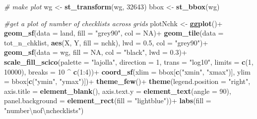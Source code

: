 \documentclass[]{article}
\newenvironment{Shaded}{}{}
\newcommand{\CharTok}[1]{\textcolor[rgb]{0.25,0.44,0.63}{#1}}
\newcommand{\CommentTok}[1]{\textcolor[rgb]{0.38,0.63,0.69}{\textit{#1}}}
\newcommand{\DataTypeTok}[1]{\textcolor[rgb]{0.56,0.13,0.00}{#1}}
\newcommand{\DecValTok}[1]{\textcolor[rgb]{0.25,0.63,0.44}{#1}}
\newcommand{\FloatTok}[1]{\textcolor[rgb]{0.25,0.63,0.44}{#1}}
\newcommand{\KeywordTok}[1]{\textcolor[rgb]{0.00,0.44,0.13}{\textbf{#1}}}
\newcommand{\NormalTok}[1]{#1}
\newcommand{\OperatorTok}[1]{\textcolor[rgb]{0.40,0.40,0.40}{#1}}
\newcommand{\OtherTok}[1]{\textcolor[rgb]{0.00,0.44,0.13}{#1}}
\newcommand{\StringTok}[1]{\textcolor[rgb]{0.25,0.44,0.63}{#1}}
\begin{document}
\begin{Shaded}
\begin{Highlighting}[]
\CommentTok{# make plot}
\NormalTok{wg <-}\StringTok{ }\KeywordTok{st_transform}\NormalTok{(wg, }\DecValTok{32643}\NormalTok{)}
\NormalTok{bbox <-}\StringTok{ }\KeywordTok{st_bbox}\NormalTok{(wg)}

\CommentTok{#get a plot of number of checklists across grids}
\NormalTok{plotNchk <-}
\StringTok{  }\KeywordTok{ggplot}\NormalTok{()}\OperatorTok{+}
\StringTok{  }\KeywordTok{geom_sf}\NormalTok{(}\DataTypeTok{data =}\NormalTok{ land, }\DataTypeTok{fill =} \StringTok{"grey90"}\NormalTok{, }\DataTypeTok{col =} \OtherTok{NA}\NormalTok{)}\OperatorTok{+}
\StringTok{  }\KeywordTok{geom_tile}\NormalTok{(}\DataTypeTok{data =}\NormalTok{ tot_n_chklist,}
            \KeywordTok{aes}\NormalTok{(X, Y, }\DataTypeTok{fill =}\NormalTok{ nchk), }\DataTypeTok{lwd =} \FloatTok{0.5}\NormalTok{, }\DataTypeTok{col =} \StringTok{"grey90"}\NormalTok{)}\OperatorTok{+}
\StringTok{  }\KeywordTok{geom_sf}\NormalTok{(}\DataTypeTok{data =}\NormalTok{ wg, }\DataTypeTok{fill =} \OtherTok{NA}\NormalTok{, }\DataTypeTok{col =} \StringTok{"black"}\NormalTok{, }\DataTypeTok{lwd =} \FloatTok{0.3}\NormalTok{)}\OperatorTok{+}
\StringTok{  }\KeywordTok{scale_fill_scico}\NormalTok{(}\DataTypeTok{palette =} \StringTok{"lajolla"}\NormalTok{, }
                   \DataTypeTok{direction =} \DecValTok{1}\NormalTok{,}
                   \DataTypeTok{trans =} \StringTok{"log10"}\NormalTok{,}
                   \DataTypeTok{limits =} \KeywordTok{c}\NormalTok{(}\DecValTok{1}\NormalTok{, }\DecValTok{10000}\NormalTok{),}
                   \DataTypeTok{breaks =} \DecValTok{10} \OperatorTok{^}\StringTok{ }\KeywordTok{c}\NormalTok{(}\DecValTok{1}\OperatorTok{:}\DecValTok{4}\NormalTok{))}\OperatorTok{+}
\StringTok{  }\KeywordTok{coord_sf}\NormalTok{(}\DataTypeTok{xlim =}\NormalTok{ bbox[}\KeywordTok{c}\NormalTok{(}\StringTok{"xmin"}\NormalTok{, }\StringTok{"xmax"}\NormalTok{)], }\DataTypeTok{ylim =}\NormalTok{ bbox[}\KeywordTok{c}\NormalTok{(}\StringTok{"ymin"}\NormalTok{, }\StringTok{"ymax"}\NormalTok{)])}\OperatorTok{+}
\StringTok{  }\KeywordTok{theme_few}\NormalTok{()}\OperatorTok{+}
\StringTok{  }\KeywordTok{theme}\NormalTok{(}\DataTypeTok{legend.position =} \StringTok{"right"}\NormalTok{, }
        \DataTypeTok{axis.title =} \KeywordTok{element_blank}\NormalTok{(),}
        \DataTypeTok{axis.text.y =} \KeywordTok{element_text}\NormalTok{(}\DataTypeTok{angle =} \DecValTok{90}\NormalTok{),}
        \DataTypeTok{panel.background =} \KeywordTok{element_rect}\NormalTok{(}\DataTypeTok{fill =} \StringTok{"lightblue"}\NormalTok{))}\OperatorTok{+}
\StringTok{  }\KeywordTok{labs}\NormalTok{(}\DataTypeTok{fill =} \StringTok{"number}\CharTok{\textbackslash{}n}\StringTok{of}\CharTok{\textbackslash{}n}\StringTok{checklists"}\NormalTok{)}


\end{Highlighting}
\end{Shaded}
\end{document}
